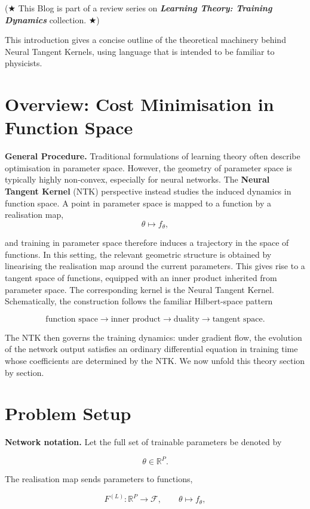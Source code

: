 (★ This Blog is part of a review series on \emph{\textbf{Learning Theory: Training Dynamics}} collection. ★)

This introduction gives a concise outline of the theoretical machinery behind Neural Tangent Kernels, using language that is intended to be familiar to physicists.

\section{Overview: Cost Minimisation in Function Space}

\textbf{General Procedure.} Traditional formulations of learning theory often describe optimisation in parameter space. However, the geometry of parameter space is typically highly non-convex, especially for neural networks. The \textbf{Neural Tangent Kernel} (NTK) perspective instead studies the induced dynamics in function space. A point in parameter space is mapped to a function by a realisation map, \[
\theta \mapsto f_\theta ,
\]

and training in parameter space therefore induces a trajectory in the space of functions. In this setting, the relevant geometric structure is obtained by linearising the realisation map around the current parameters. This gives rise to a tangent space of functions, equipped with an inner product inherited from parameter space. The corresponding kernel is the Neural Tangent Kernel. Schematically, the construction follows the familiar Hilbert-space pattern

\[
\text{function space}
\longrightarrow
\text{inner product}
\longrightarrow
\text{duality}
\longrightarrow
\text{tangent space}.
\]

The NTK then governs the training dynamics: under gradient flow, the evolution of the network output satisfies an ordinary differential equation in training time whose coefficients are determined by the NTK. We now unfold this theory section by section.

\section{Problem Setup}

\textbf{Network notation.} Let the full set of trainable parameters be denoted by

\[
\theta \in \mathbb{R}^{P}.
\]

The realisation map sends parameters to functions,

\[
    F^{(L)} : \mathbb{R}^{P} \to \mathcal{F},
    \qquad
    \theta \mapsto f_\theta ,
\]

